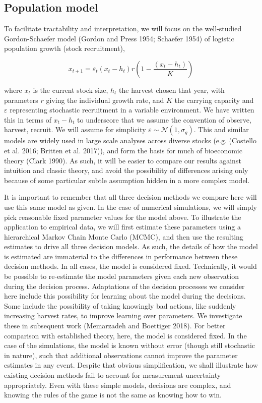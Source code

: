 \documentclass[3p]{elsarticle} %
\begin{document}
\hypertarget{population-model}{%
\subsection{Population model}\label{population-model}}

To facilitate tractability and interpretation, we will focus on the
well-studied Gordon-Schaefer model (Gordon and Press 1954; Schaefer
1954) of logistic population growth (stock recruitment),

\begin{equation}
x_{t+1} = \varepsilon_t (x_t-h_t) r  \left(1 - \frac{(x_t-h_t)}{K}\right) \label{Gordon-Schaefer}
\end{equation}

where \(x_t\) is the current stock size, \(h_t\) the harvest chosen that
year, with parameters \(r\) giving the individual growth rate, and \(K\)
the carrying capacity and \(\varepsilon\) representing stochastic
recruitment in a variable environment. We have written this in terms of
\(x_t - h_t\) to underscore that we assume the convention of observe,
harvest, recruit. We will assume for simplicity
\(\varepsilon \sim \mathcal{N}(1, \sigma_g)\). This and similar models
are widely used in large scale analyses across diverse stocks (e.g.
(Costello et al. 2016; Britten et al. 2017)), and form the basis for
much of bioeconomic theory (Clark 1990). As such, it will be easier to
compare our results against intuition and classic theory, and avoid the
possibility of differences arising only because of some particular
subtle assumption hidden in a more complex model.

It is important to remember that all three decision methods we compare
here will use this same model as given. In the case of numerical
simulations, we will simply pick reasonable fixed parameter values for
the model above. To illustrate the application to empirical data, we
will first estimate these parameters using a hierarchical Markov Chain
Monte Carlo (MCMC), and then use the resulting estimates to drive all
three decision models. As such, the details of how the model is
estimated are immaterial to the differences in performance between these
decision methods. In all cases, the model is considered fixed.
Technically, it would be possible to re-estimate the model parameters
given each new observation during the decision process. Adaptations of
the decision processes we consider here include this possibility for
learning about the model during the decisions. Some include the
possibility of taking knowingly bad actions, like suddenly increasing
harvest rates, to improve learning over parameters. We investigate these
in subsequent work (Memarzadeh and Boettiger 2018). For better
comparison with established theory, here, the model is considered fixed.
In the case of the simulations, the model is known without error (though
still stochastic in nature), such that additional observations cannot
improve the parameter estimates in any event. Despite that obvious
simplification, we shall illustrate how existing decision methods fail
to account for measurement uncertainty appropriately. Even with these
simple models, decisions are complex, and knowing the rules of the game
is not the same as knowing how to win.
\end{document}
